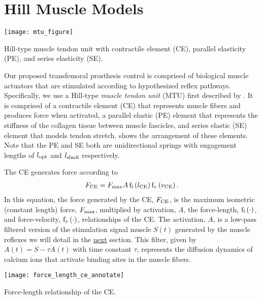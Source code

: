 \section{Hill Muscle Models}\label{sec:neuro_hill_muscle}
\begin{marginfigure}[-0.25in]
    \centering
    \texttt{[image: mtu\_figure]}
    \vspace{-0.4in}
    \caption{Hill-type muscle tendon unit with contractile element (CE),
    parallel elasticity (PE), and series elasticity (SE).}
    \label{fig:hill_type_mtu}
\end{marginfigure}
Our proposed transfemoral prosthesis control is comprised of biological muscle
actuators that are stimulated according to hypothesized reflex pathways.
Specifically, we use a Hill-type \emph{muscle tendon unit} (MTU) first described
by \citet{hill1938heat}. It is comprised of a contractile element (CE) that
represents muscle fibers and produces force when activated, a parallel elastic
(PE) element that represents the stiffness of the collagen tissue between muscle
fascicles, and series elastic (SE) element that models tendon stretch.
 shows the arrangement of these elements. Note that the
PE and SE both are unidirectional springs with engagement lengths of
$l_{\mathrm{opt}}$ and $l_{\mathrm{slack}}$ respectively.

The CE generates force according to
\begin{align}
    F_\tn{CE} = F_\tn{max} A \func{f_l}{l_\tn{CE}} \func{f_v}{v_\tn{CE}}.
    \label{eq:hill_ce}
\end{align}
In this equation, the force generated by the CE, $F_{\mathrm{CE}}$, is the maximum
isometric (constant length) force, $F_{\mathrm{max}}$, multiplied by activation, $A$,
the force-length, $\func{f_l}{\cdot}$, and force-velocity, $\func{f_v}{\cdot}$,
relationships of the CE\@. The activation, $A$, is a low-pass filtered version
of the stimulation signal muscle $S(t)$ generated by the muscle reflexes we will
detail in the \hyperref[sec:neuro_stance_reflexes]{next} section. This filter,
given by $A(t) = S - \tau \dot A(t)$ with time constant $\tau$, represents the
diffusion dynamics of calcium ions that activate binding sites in the muscle
fibers.
\begin{marginfigure}[-1in]
    \centering
    \texttt{[image: force\_length\_ce\_annotate]}
    \vspace{-0.25in}
    \caption{Force-length relationship of the CE.}
    \label{fig:force_length_ce}
\end{marginfigure}

